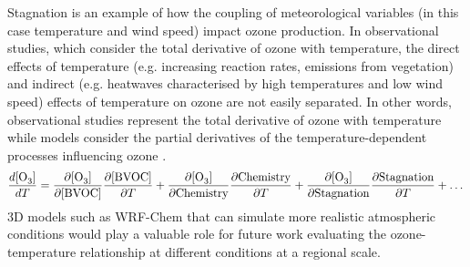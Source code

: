 Stagnation is an example of how the coupling of meteorological variables (in this case temperature and wind speed) impact ozone production.
In observational studies, which consider the total derivative of ozone with temperature, the direct effects of temperature (e.g. increasing reaction rates, emissions from vegetation) and indirect (e.g. heatwaves characterised by high temperatures and low wind speed) effects of temperature on ozone are not easily separated.
In other words, observational studies represent the total derivative of ozone with temperature while models consider the partial derivatives of the temperature-dependent processes influencing ozone \citep{Rasmussen:2013}. 
\begin{equation*} 
    \frac{d[\ce{O3}]}{dT} = \frac{\partial [\ce{O3}]}{\partial [\text{BVOC}]}\frac{\partial [\text{BVOC}]}{\partial T} + \frac{\partial [\ce{O3}]}{\partial \text{Chemistry}}\frac{\partial \text{Chemistry}}{\partial T} + \frac{\partial [\ce{O3}]}{\partial \text{Stagnation}}\frac{\partial \text{Stagnation}}{\partial T} + \dots
\end{equation*}
3D models such as WRF-Chem that can simulate more realistic atmospheric conditions would play a valuable role for future work evaluating the ozone-temperature relationship at different  conditions at a regional scale.
